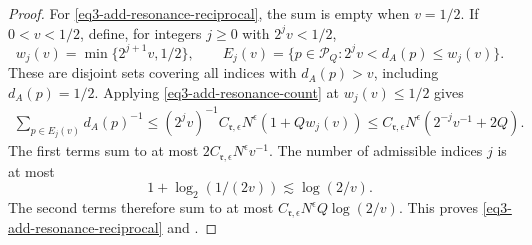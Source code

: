 \documentclass[reqno,12pt]{amsart}
\numberwithin{equation}{section}
\begin{document}
\begin{proof}
For \eqref{eq3-add-resonance-reciprocal}, the sum is empty when
$v=1/2$. If $0<v<1/2$, define, for integers $j\ge0$ with
$2^jv<1/2$,
\[
 w_j(v)=\min\{2^{j+1}v,1/2\},\qquad
 E_j(v)=\{p\in\mathcal P_Q:2^jv<d_A(p)\le w_j(v)\}.
\]
These are disjoint sets covering all indices with $d_A(p)>v$,
including $d_A(p)=1/2$. Applying
\eqref{eq3-add-resonance-count} at $w_j(v)\le1/2$ gives
\[
 \begin{split}
 \sum_{p\in E_j(v)}d_A(p)^{-1}
 \le(2^jv)^{-1}C_{\mathfrak r,\epsilon}N^\epsilon
                                    (1+Qw_j(v))
 \le C_{\mathfrak r,\epsilon}N^\epsilon
                                    (2^{-j}v^{-1}+2Q).
 \end{split}
\]
The first terms sum to at most
$2C_{\mathfrak r,\epsilon}N^\epsilon v^{-1}$.
The number of admissible indices $j$ is at most
\[
 1+\log_2(1/(2v))\lesssim \log(2/v).
\]
The second terms therefore sum to at most
$C_{\mathfrak r,\epsilon}N^\epsilon Q\log(2/v)$.
This proves \eqref{eq3-add-resonance-reciprocal} and
.
\end{proof}
\end{document}
